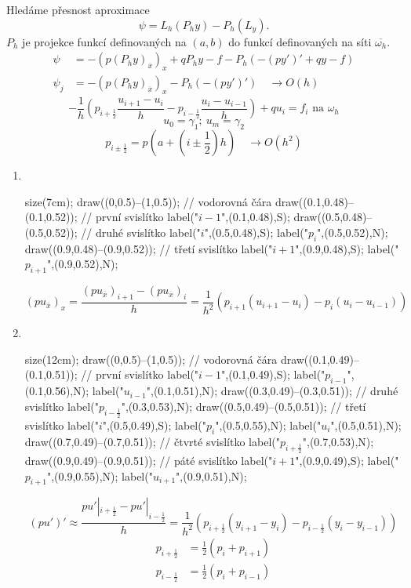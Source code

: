 	Hledáme přesnost aproximace
	$$ \psi = L_h(P_h y ) - P_h(L_y).$$
	$P_h$ je projekce funkcí definovaných na $(a, b)$ do funkcí definovaných na síti
	$\overline{\omega_h}$.
	\begin{align*}
		\psi &= -(p(P_h y)_{\overline{x}})_x + qP_hy - f - P_h(-(py')' + qy - f) \\
		\psi_j &= -(p(P_h y)_{\overline{x}})_x - P_h(-(py')') \quad \rightarrow O(h)
	\end{align*}
	$$ - \frac{1}{h} \left( p_{i + \frac{1}{2}} \frac{u_{i+1} - u_i}{h} - p_{i - \frac{1}{2}}
	\frac{u_i - u_{i-1}}{h} \right)  + qu_i = f_i \text{ na } \omega_h$$
	$$ u_0 = \gamma_1;\ u_m = \gamma_2 $$
	$$ p_{i \pm \frac{1}{2}} = p\left(a + \left(i \pm \frac{1}{2}\right)h \right) \quad
	\rightarrow O(h^2)$$
	\begin{enumerate}
		\item ~\\ \vspace{-1cm}
			\begin{asy}
				size(7cm);
				draw((0,0.5)--(1,0.5));	// vodorovná čára
				draw((0.1,0.48)--(0.1,0.52));	// první svislítko
				label("$i-1$",(0.1,0.48),S);
				draw((0.5,0.48)--(0.5,0.52));	// druhé svislítko
				label("$i$",(0.5,0.48),S);
				label("$p_i$",(0.5,0.52),N);
				draw((0.9,0.48)--(0.9,0.52));	// třetí svislítko
				label("$i+1$",(0.9,0.48),S);
				label("$p_{i+1}$",(0.9,0.52),N);
			\end{asy}
			$$ (pu_{\overline{x}})_x = \frac{(pu_{\overline{x}})_{i+1} - (pu_{\overline{x}})_i}
			{h} = \frac{1}{h^2} (p_{i+1}(u_{i+1} - u_i) - p_i(u_i - u_{i-1})) $$
		\item ~\\ \vspace{-1cm}
			\begin{asy}
				size(12cm);
				draw((0,0.5)--(1,0.5));	// vodorovná čára
				draw((0.1,0.49)--(0.1,0.51));	// první svislítko
				label("$i-1$",(0.1,0.49),S);
				label("$p_{i-1}$",(0.1,0.56),N);
				label("$u_{i-1}$",(0.1,0.51),N);
				draw((0.3,0.49)--(0.3,0.51));	// druhé svislítko
				label("$p_{i-\frac{1}{2}}$",(0.3,0.53),N);
				draw((0.5,0.49)--(0.5,0.51));	// třetí svislítko
				label("$i$",(0.5,0.49),S);
				label("$p_i$",(0.5,0.55),N);
				label("$u_i$",(0.5,0.51),N);
				draw((0.7,0.49)--(0.7,0.51));	// čtvrté svislítko
				label("$p_{i+\frac{1}{2}}$",(0.7,0.53),N);
				draw((0.9,0.49)--(0.9,0.51));	// páté svislítko
				label("$i+1$",(0.9,0.49),S);
				label("$p_{i+1}$",(0.9,0.55),N);
				label("$u_{i+1}$",(0.9,0.51),N);
			\end{asy}
			$$ (pu')' \approx \frac{pu'|_{i + \frac{1}{2}} - pu'|_{i - \frac{1}{2}}}{h} =
			\frac{1}{h^2}(p_{i + \frac{1}{2}}(y_{i+1} - y_i) - p_{i - \frac{1}{2}}(y_i - y_{i-1}))$$
			\begin{align*}
				p_{i + \frac{1}{2}} &= \frac{1}{2}(p_i + p_{i+1}) \\
				p_{i - \frac{1}{2}} &= \frac{1}{2}(p_i + p_{i-1})
			\end{align*}
	\end{enumerate}
	

